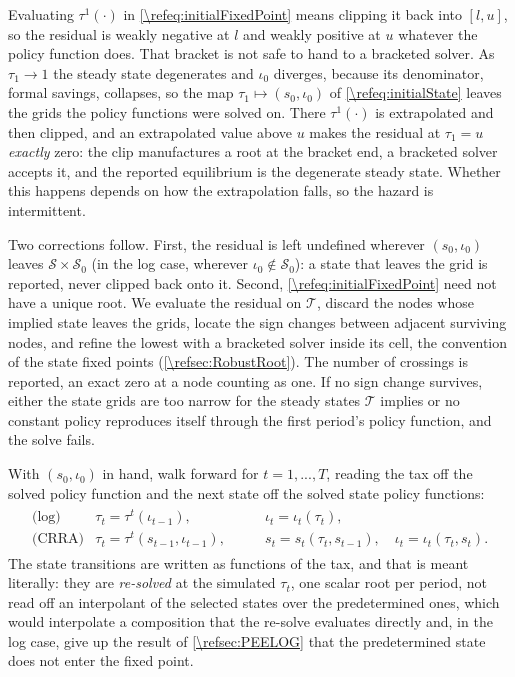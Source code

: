 Evaluating $\tau^1(\cdot)$ in \eqref{\refeq:initialFixedPoint} means clipping it back into $[l,u]$, so the residual is weakly negative at $l$ and weakly positive at $u$ whatever the policy function does. That bracket is not safe to hand to a bracketed solver. As $\tau_1\rightarrow 1$ the steady state degenerates and $\iota_0$ diverges, because its denominator, formal savings, collapses, so the map $\tau_1\mapsto(s_0,\iota_0)$ of \eqref{\refeq:initialState} leaves the grids the policy functions were solved on. There $\tau^1(\cdot)$ is extrapolated and then clipped, and an extrapolated value above $u$ makes the residual at $\tau_1 = u$ \emph{exactly} zero: the clip manufactures a root at the bracket end, a bracketed solver accepts it, and the reported equilibrium is the degenerate steady state. Whether this happens depends on how the extrapolation falls, so the hazard is intermittent.

Two corrections follow. First, the residual is left undefined wherever $(s_0,\iota_0)$ leaves $\mathcal{S}\times\mathcal{S}_0$ (in the log case, wherever $\iota_0\notin\mathcal{S}_0$): a state that leaves the grid is reported, never clipped back onto it. Second, \eqref{\refeq:initialFixedPoint} need not have a unique root. We evaluate the residual on $\mathcal{T}$, discard the nodes whose implied state leaves the grids, locate the sign changes between adjacent surviving nodes, and refine the lowest with a bracketed solver inside its cell, the convention of the state fixed points (\cref{\refsec:RobustRoot}). The number of crossings is reported, an exact zero at a node counting as one. If no sign change survives, either the state grids are too narrow for the steady states $\mathcal{T}$ implies or no constant policy reproduces itself through the first period's policy function, and the solve fails.

With $(s_0,\iota_0)$ in hand, walk forward for $t = 1,...,T$, reading the tax off the solved policy function and the next state off the solved state policy functions:
\begin{align}\label{\refeq:forwardSim}
    \begin{array}{lll}
    \text{(log)} & \tau_t = \tau^t\left(\iota_{t-1}\right), & \iota_t = \iota_t\left(\tau_t\right), \\[4pt]
    \text{(CRRA)} & \tau_t = \tau^t\left(s_{t-1},\iota_{t-1}\right), \qquad & s_t = s_t\left(\tau_t, s_{t-1}\right),\quad \iota_t = \iota_t\left(\tau_t,s_t\right).
    \end{array}
\end{align}
The state transitions are written as functions of the tax, and that is meant literally: they are \emph{re-solved} at the simulated $\tau_t$, one scalar root per period, not read off an interpolant of the selected states over the predetermined ones, which would interpolate a composition that the re-solve evaluates directly and, in the log case, give up the result of \cref{\refsec:PEELOG} that the predetermined state does not enter the fixed point.

